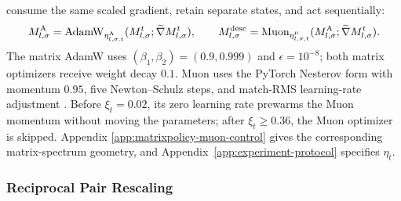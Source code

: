 \documentclass{article}
\begin{document}
consume the same scaled gradient, retain separate states, and act sequentially:
\begin{equation}
\begin{aligned}
    M_{l,\sigma}^{\rm A}
    =
    \operatorname{AdamW}_{\eta^{\rm A}_{l,\sigma,t}}
    (M_{l,\sigma}^{t};\widetilde\nabla M_{l,\sigma}^{t}),
    \qquad
    M_{l,\sigma}^{\rm desc}
    =
    \operatorname{Muon}_{\eta^{\mu}_{l,\sigma,t}}
    (M_{l,\sigma}^{\rm A};\widetilde\nabla M_{l,\sigma}^{t}).
\end{aligned}
   \label{eq:matrix-branch-step}
\end{equation}
The matrix AdamW uses $(\beta_1,\beta_2)=(0.9,0.999)$ and
$\epsilon=10^{-8}$; both matrix optimizers receive weight decay $0.1$.  Muon
uses the PyTorch Nesterov form with momentum $0.95$, five Newton--Schulz steps,
and match-RMS learning-rate adjustment \citep{liu2025muon}.  Before
$\xi_t=0.02$, its zero learning rate
prewarms the Muon momentum without moving the parameters; after
$\xi_t\ge0.36$, the Muon optimizer is skipped.  Appendix
\ref{app:matrixpolicy-muon-control} gives the corresponding matrix-spectrum
geometry, and Appendix~\ref{app:experiment-protocol} specifies $\eta_t$.

\subsubsection{Reciprocal Pair Rescaling}
\end{document}
